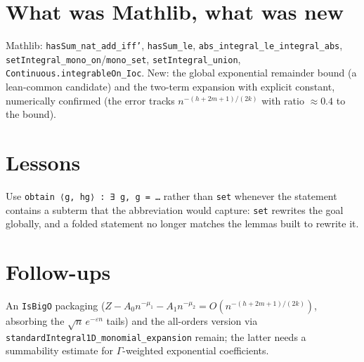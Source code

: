 \documentclass[11pt]{article}
\begin{document}
\section{What was Mathlib, what was new}
Mathlib: \texttt{hasSum\_nat\_add\_iff'}, \texttt{hasSum\_le}, \texttt{abs\_integral\_le\_integral\_abs},
\texttt{setIntegral\_mono\_on}/\texttt{mono\_set}, \texttt{setIntegral\_union},
\texttt{Continuous.integrableOn\_Ioc}. New: the global exponential remainder bound (a lean-common
candidate) and the two-term expansion with explicit constant, numerically confirmed (the error tracks
$n^{-(h+2m+1)/(2k)}$ with ratio $\approx0.4$ to the bound).

\section{Lessons}
Use \texttt{obtain ⟨g, hg⟩ : ∃ g, g = \dots} rather than \texttt{set} whenever the statement contains
a subterm that the abbreviation would capture: \texttt{set} rewrites the goal globally, and a folded
statement no longer matches the lemmas built to rewrite it.

\section{Follow-ups}
An \texttt{IsBigO} packaging ($Z-A_0n^{-\mu_1}-A_1n^{-\mu_2}=O(n^{-(h+2m+1)/(2k)})$, absorbing the
$\sqrt n\,e^{-\varepsilon n}$ tails) and the all-orders version via \texttt{standardIntegral1D\_monomial\_expansion}
remain; the latter needs a summability estimate for $\Gamma$-weighted exponential coefficients.
\end{document}
